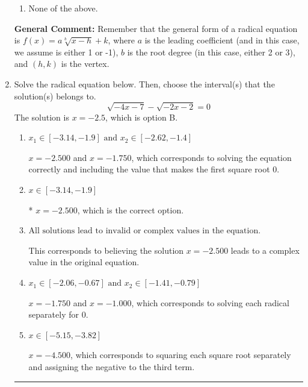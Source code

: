 \documentclass{extbook}[14pt]
\newcommand{\litem}[1]{\item #1

\rule{\textwidth}{0.4pt}}
\begin{document}
\begin{enumerate}
{\begin{enumerate}[label=\Alph*.]
\begin{multicols}{2}
\end{multicols}\item None of the above.\end{enumerate}
\textbf{General Comment:} Remember that the general form of a radical equation is $ f(x) = a \sqrt[b]{x - h} + k $, where $a$ is the leading coefficient (and in this case, we assume is either 1 or -1), $b$ is the root degree (in this case, either 2 or 3), and $(h, k)$ is the vertex.
}
\litem{
Solve the radical equation below. Then, choose the interval(s) that the solution(s) belongs to.
\[ \sqrt{-4 x - 7} - \sqrt{-2 x - 2} = 0 \]The solution is \( x = -2.5 \), which is option B.\begin{enumerate}[label=\Alph*.]
\item \( x_1 \in [-3.14, -1.9] \text{ and } x_2 \in [-2.62,-1.4] \)

$x = -2.500$ and $x = -1.750$, which corresponds to solving the equation correctly and including the value that makes the first square root 0.
\item \( x \in [-3.14,-1.9] \)

* $x = -2.500$, which is the correct option.
\item \( \text{All solutions lead to invalid or complex values in the equation.} \)

This corresponds to believing the solution $x = -2.500$ leads to a complex value in the original equation.
\item \( x_1 \in [-2.06, -0.67] \text{ and } x_2 \in [-1.41,-0.79] \)

$x = -1.750$ and $x = -1.000$, which corresponds to solving each radical separately for 0.
\item \( x \in [-5.15,-3.82] \)

$x = -4.500$, which corresponds to squaring each square root separately and assigning the negative to the third term.
\end{enumerate}

}
\end{enumerate}
\end{document}
